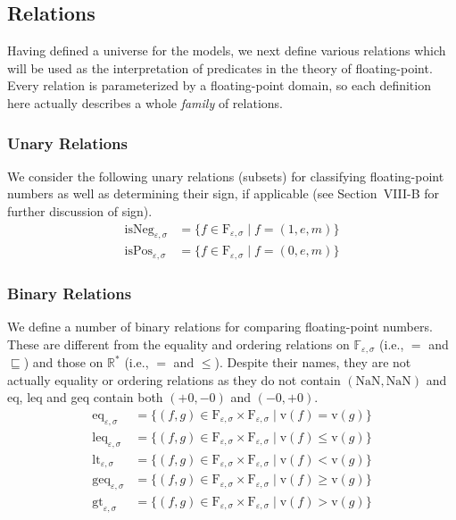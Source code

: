 \subsection{Relations}

Having defined a universe for the models, we next define various relations which will be used as the interpretation of predicates in the theory of floating-point. Every relation is parameterized by a floating-point domain, so each definition here actually describes a whole \emph{family} of relations.

\subsubsection{Unary Relations}
We consider the following unary relations (subsets) for classifying floating-point numbers as well as determining their sign, if applicable (see Section~VIII-B for further discussion of sign)\footnotemark[6].
\begin{align*}
\text{isNeg}_{\varepsilon,\sigma} &= \{f \in \mathrm{F}_{\varepsilon,\sigma} \mid f = (1, e, m)\} \\
\text{isPos}_{\varepsilon,\sigma} &= \{f \in \mathrm{F}_{\varepsilon,\sigma} \mid f = (0, e, m)\}
\end{align*}

\subsubsection{Binary Relations}
We define a number of binary relations for comparing floating-point numbers. These are different from the equality and ordering relations on $\mathbb{F}_{\varepsilon,\sigma}$ (i.e., $=$ and $\sqsubseteq$) and those on $\mathbb{R}^*$ (i.e., $=$ and $\leqslant$). Despite their names, they are not actually equality or ordering relations as they do not contain $(\text{NaN}, \text{NaN})$ and eq, leq and geq contain both $(+0, -0)$ and $(-0, +0)$.
\begin{align*}
\text{eq}_{\varepsilon,\sigma} &= \{(f,g) \in \mathrm{F}_{\varepsilon,\sigma} \times \mathrm{F}_{\varepsilon,\sigma} \mid \mathrm{v}(f) = \mathrm{v}(g)\} \\
\text{leq}_{\varepsilon,\sigma} &= \{(f,g) \in \mathrm{F}_{\varepsilon,\sigma} \times \mathrm{F}_{\varepsilon,\sigma} \mid \mathrm{v}(f) \leqslant \mathrm{v}(g)\} \\
\text{lt}_{\varepsilon,\sigma} &= \{(f,g) \in \mathrm{F}_{\varepsilon,\sigma} \times \mathrm{F}_{\varepsilon,\sigma} \mid \mathrm{v}(f) < \mathrm{v}(g)\} \\
\text{geq}_{\varepsilon,\sigma} &= \{(f,g) \in \mathrm{F}_{\varepsilon,\sigma} \times \mathrm{F}_{\varepsilon,\sigma} \mid \mathrm{v}(f) \geqslant \mathrm{v}(g)\} \\
\text{gt}_{\varepsilon,\sigma} &= \{(f,g) \in \mathrm{F}_{\varepsilon,\sigma} \times \mathrm{F}_{\varepsilon,\sigma} \mid \mathrm{v}(f) > \mathrm{v}(g)\}
\end{align*}

